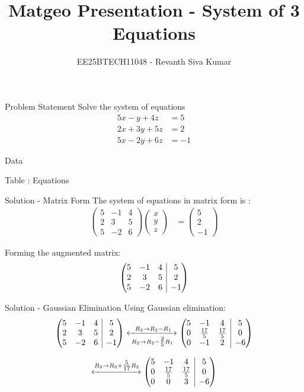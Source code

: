 \documentclass{beamer}
\title{Matgeo Presentation - System of 3 Equations}
\author{EE25BTECH11048 - Revanth Siva Kumar}
\makeatletter
\numberwithin{equation}{section}
\providecommand{\myvec}[1]{\ensuremath{\begin{pmatrix}#1\end{pmatrix}}}
\newenvironment{amatrix}[1]{%
  \left(\begin{array}{@{}*{#1}{c}|c@{}}
}{%
  \end{array}\right)
}
\newcommand{\myaugvec}[2]{\ensuremath{\begin{amatrix}{#1}#2\end{amatrix}}}
\makeatother
\begin{document}
\begin{frame}
  \titlepage
\end{frame}

\begin{frame}{Problem Statement}
Solve the system of equations
\[
\begin{aligned}
5x - y + 4z &= 5\\
2x + 3y + 5z &= 2\\
5x - 2y + 6z &= -1
\end{aligned}
\]
\end{frame}

\begin{frame}{Data}
\begin{table}[h!]
  \centering
  
  \caption*{Table : Equations}
  \label{problem_data}
\end{table}
\end{frame}

\begin{frame}{Solution - Matrix Form}
The system of equations in matrix form is :
\begin{align}
  \myvec{5 & -1 & 4\\2 & 3 & 5\\5 & -2 & 6}\myvec{x\\y\\z} &= \myvec{5\\2\\-1}
\end{align}

Forming the augmented matrix:
\begin{align}
  \myaugvec{3}{5 & -1 & 4 & 5\\2 & 3 & 5 & 2\\5 & -2 & 6 & -1}
\end{align}
\end{frame}

\begin{frame}{Solution - Gaussian Elimination}
Using Gaussian elimination:
\begin{align}
  \myaugvec{3}{5 & -1 & 4 & 5\\2 & 3 & 5 & 2\\5 & -2 & 6 & -1}
  \xleftrightarrow[\;R_2 \to R_2 - \tfrac{2}{5}R_1\;]{\;R_3 \to R_3 - R_1}
  \myaugvec{3}{5 & -1 & 4 & 5\\0 & \tfrac{17}{5} & \tfrac{17}{5} & 0\\0 & -1 & 2 & -6}
\end{align}

\begin{align}
  \xleftrightarrow{R_3 \to R_3 + \tfrac{5}{17}R_2}
  \myaugvec{3}{5 & -1 & 4 & 5\\0 & \tfrac{17}{5} & \tfrac{17}{5} & 0\\0 & 0 & 3 & -6}
\end{align}
\end{frame}
\end{document}
